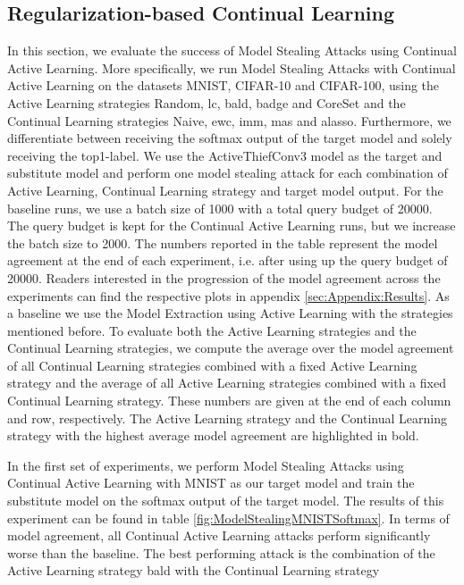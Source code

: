 \subsection{Regularization-based Continual Learning}
\label{sec:Evaluation:Results:MS:Regularization}


In this section, we evaluate the success of Model Stealing Attacks using Continual Active Learning. More specifically, we run Model Stealing Attacks with Continual Active Learning on the datasets MNIST, CIFAR-10 and CIFAR-100, using the Active Learning strategies
Random, \gls{lc}, \gls{bald}, \gls{badge} and CoreSet and the Continual Learning strategies Naive, \gls{ewc}, \gls{imm}, \gls{mas} and \gls{alasso}. Furthermore, we differentiate between receiving the softmax output of the target model and solely receiving the top1-label. We use the ActiveThiefConv3 model
as the target and substitute model and perform one model stealing attack for each combination of Active Learning, Continual Learning strategy and target model output. For the baseline runs, we use a batch size of 1000 with a total query budget of 20000. The query budget
is kept for the Continual Active Learning runs, but we increase the batch size to 2000. The numbers reported in the table represent the model agreement at the end of each experiment, i.e. after using up the query budget of 20000. Readers interested in the progression of the
model agreement across the experiments can find the respective plots in appendix \ref{sec:Appendix:Results}. As a baseline we use the Model Extraction using Active Learning with the strategies mentioned before. To evaluate both the Active Learning strategies and the Continual
Learning strategies, we compute the average over the model agreement of all Continual Learning strategies combined with a fixed Active Learning strategy and the average of all Active Learning strategies combined with a fixed Continual Learning strategy. These numbers are given
at the end of each column and row, respectively. The Active Learning strategy and the Continual Learning strategy with the highest average model agreement are highlighted in bold. \par
In the first set of experiments, we perform Model Stealing Attacks using Continual Active Learning with MNIST as our target model and train the substitute model on the softmax output of the target model. The results of this experiment can be found in table
\ref{fig:ModelStealingMNISTSoftmax}. In terms of model agreement, all Continual Active Learning attacks perform significantly worse than the baseline. The best performing attack is the combination of the Active Learning strategy \gls{bald} with the Continual Learning strategy
